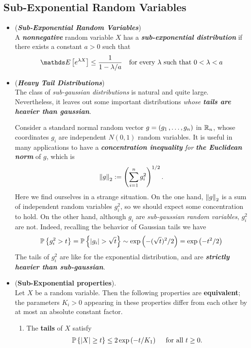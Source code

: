 \documentclass[11pt]{article}
\begin{document}
\subsection{Sub-Exponential Random Variables}
\begin{itemize}
\item \begin{definition}(\emph{\textbf{Sub-Exponential Random Variables}})\\
A \emph{\textbf{nonnegative}} random variable $X$ has a \emph{\textbf{sub-exponential distribution}} if there exists a constant $a > 0$ such that
\begin{align*}
\E{}{e^{\lambda X}} \le \frac{1}{1 - \lambda/a} \quad \text{for every $\lambda$ such that $0 < \lambda < a$} 
\end{align*}
\end{definition}

\item \begin{remark} (\emph{\textbf{Heavy Tail Distributions}})\\
The class of \emph{sub-gaussian distributions} is natural and quite large. Nevertheless, it leaves out some important distributions \emph{whose \textbf{tails are heavier than gaussian}}.

Consider a standard normal random vector $g = (g_1 \,{,}\ldots{,}\, g_n)$ in ${\mathbb R}_{n}$, whose coordinates $g_i$ are independent $N(0, 1)$ random variables. It is useful
in many applications to have a \emph{\textbf{concentration inequality} for \textbf{the Euclidean norm}} of $g$, which is
\begin{align*}
\left\|g\right\|_{2} := \left(\sum_{i=1}^{n}g_i^2\right)^{1/2}.
\end{align*}
Here we find ourselves in a strange situation. On the one hand, $\left\|g\right\|_{2}$ is a sum of independent random variables $g_i^2$, so we should expect some concentration to hold. On the other hand, although $g_i$ are \emph{sub-gaussian random variables}, $g_i^2$ are not. Indeed, recalling the behavior of Gaussian tails we have
\begin{align*}
{\mathbb P}\left\{g_i^2 > t\right\} = {\mathbb P}\left\{\left\lvert g_i \right\rvert > \sqrt{t}\right\} \sim \exp\left(- (\sqrt{t})^2/2\right) = \exp\left(- t^2/2\right)
\end{align*}
The tails of $g_i^2$ are like for the exponential distribution, and are \emph{\textbf{strictly heavier than sub-gaussian}}. 
\end{remark}

\item \begin{proposition} (\textbf{Sub-Exponential properties}).  \citep{vershynin2018high}\\
Let $X$ be a random variable. Then the following properties are \textbf{equivalent}; the parameters $K_i > 0$ appearing in these
properties differ from each other by at most an absolute constant factor.
\begin{enumerate}
\item The \textbf{tails} of $X$ satisfy
\begin{align*}
{\mathbb P}\left\{\left\lvert X \right\rvert \ge t\right\} \le 2 \exp\left(-t/K_1\right)\quad\text{ for all }t \ge 0.
\end{align*}


\end{enumerate}
\end{proposition}
\end{itemize}
\end{document}
